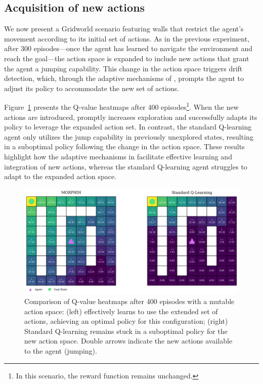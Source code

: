 \subsection{Acquisition of new actions}
We now present a Gridworld scenario featuring walls that restrict the agent's movement according to its initial set of actions. As in the previous experiment, after 300 episodes---once the agent has learned to navigate the environment and reach the goal---the action space is expanded to include new actions that grant the agent a jumping capability. This change in the action space triggers drift detection, which, through the adaptive mechanisms of \adaptiverl, prompts the agent to adjust its policy to accommodate the new set of actions. 

Figure~\ref{fig:q-value-comp2} presents the Q-value heatmaps after 400 episodes\footnote{In this scenario, the reward function remains unchanged.}. When the new actions are introduced, \adaptiverl promptly increases exploration and successfully adapts its policy to leverage the expanded action set. In contrast, the standard Q-learning agent only utilizes the jump capability in previously unexplored states, resulting in a suboptimal policy following the change in the action space. These results highlight how the adaptive mechanisms in \adaptiverl facilitate effective learning and integration of new actions, whereas the standard Q-learning agent struggles to adapt to the expanded action space.

\begin{figure}
    \centering
    \includegraphics[width=\textwidth]{figures/q_map_comp2}
    \caption{Comparison of Q-value heatmaps after 400 episodes with a mutable action space: (left) \adaptiverl effectively learns to use the extended set of actions, achieving an optimal policy for this configuration; (right) Standard Q-learning remains stuck in a suboptimal policy for the new action space. Double arrows indicate the new actions available to the agent (jumping).}
    \label{fig:q-value-comp2}
\end{figure}

